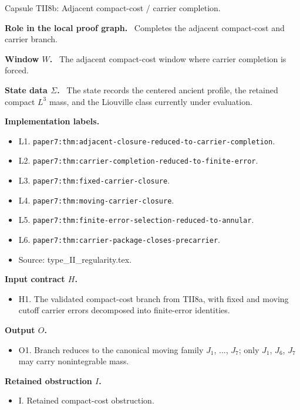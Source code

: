 \documentclass[11pt]{amsart}
\newcommand{\capsulefield}[1]{\par\smallskip\noindent\textbf{#1.}\ }
\begin{document}
\begin{proofcapsule}{Capsule TII8b: Adjacent compact-cost / carrier completion.}
  \capsulefield{Role in the local proof graph}
  Completes the adjacent compact-cost and carrier branch.

  \capsulefield{Window \(W\)}
The adjacent compact-cost window where carrier completion is forced.

  \capsulefield{State data \(\Sigma\)}
The state records the centered ancient profile, the retained compact $L^3$ mass, and the Liouville class currently under evaluation.

  \capsulefield{Implementation labels}
  \begin{itemize}[leftmargin=1.8em]
  \item L1. \texttt{paper7:thm:adjacent-closure-reduced-to-carrier-completion}.
  \item L2. \texttt{paper7:thm:carrier-completion-reduced-to-finite-error}.
  \item L3. \texttt{paper7:thm:fixed-carrier-closure}.
  \item L4. \texttt{paper7:thm:moving-carrier-closure}.
  \item L5. \texttt{paper7:thm:finite-error-selection-reduced-to-annular}.
  \item L6. \texttt{paper7:thm:carrier-package-closes-precarrier}.
  \item Source: type\_II\_regularity.tex.
  \end{itemize}

  \capsulefield{Input contract \(H\)}
  \begin{itemize}[leftmargin=1.8em]
  \item H1. The validated compact-cost branch from TII8a, with fixed and moving cutoff carrier errors decomposed into finite-error identities.
  \end{itemize}

  \capsulefield{Output \(O\)}
  \begin{itemize}[leftmargin=1.8em]
  \item O1. Branch reduces to the canonical moving family $J_1$, ..., $J_7$; only $J_1$, $J_6$, $J_7$ may carry nonintegrable mass.
  \end{itemize}

  \capsulefield{Retained obstruction \(I\)}
  \begin{itemize}[leftmargin=1.8em]
  \item I. Retained compact-cost obstruction.
  \end{itemize}


\end{proofcapsule}
\end{document}
